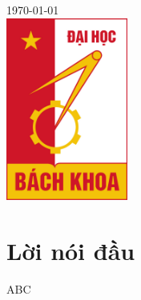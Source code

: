 \documentclass[12pt]{report}
\begin{document}
\begin{titlepage}


{\large \today}\\[1cm] %


\includegraphics[width=4cm]{hust.jpg}\\[1cm] %
 

\vfill %

\end{titlepage}

\tableofcontents 
\newpage

\newpage
\setcounter{page}{1}

\section*{Lời nói đầu}
ABC


{}

\end{document}

